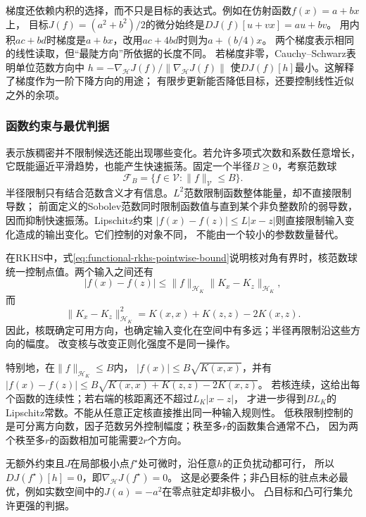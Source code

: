 梯度还依赖内积的选择，而不只是目标的表达式。例如在仿射函数$f(x)=a+bx$上，
目标$J(f)=(a^2+b^2)/2$的微分始终是$DJ(f)[u+vx]=au+bv$。
用内积$ac+bd$时梯度是$a+bx$，改用$ac+4bd$时则为$a+(b/4)x$。
两个梯度表示相同的线性读取，但“最陡方向”所依据的长度不同。
若梯度非零，Cauchy--Schwarz表明单位范数方向中
$h=-\nabla_{\mathcal H}J(f)/\lVert\nabla_{\mathcal H}J(f)\rVert$
使$DJ(f)[h]$最小。这解释了梯度作为一阶下降方向的用途；
有限步更新能否降低目标，还要控制线性近似之外的余项。

\subsubsection{函数约束与最优判据}

表示族稠密并不限制候选还能出现哪些变化。若允许多项式次数和系数任意增长，
它既能逼近平滑趋势，也能产生快速振荡。固定一个半径$B\geq0$，考察范数球
\[
  \mathcal{F}_B
  =
  \{f\in\mathcal{V}:\lVert f\rVert_{\mathcal{V}}\leq B\}.
\]
半径限制只有结合范数含义才有信息。$L^2$范数限制函数整体能量，却不直接限制导数；
前面定义的Sobolev范数同时限制函数值与直到某个非负整数阶的弱导数，
因而抑制快速振荡。Lipschitz约束
$|f(x)-f(z)|\leq L|x-z|$则直接限制输入变化造成的输出变化。它们控制的对象不同，
不能由一个较小的参数数量替代。

在RKHS中，式\eqref{eq:functional-rkhs-pointwise-bound}说明核对角有界时，核范数球
统一控制点值。两个输入之间还有
\begin{equation}
  |f(x)-f(z)|
  \leq
  \lVert f\rVert_{\mathcal{H}_K}
  \lVert K_x-K_z\rVert_{\mathcal{H}_K},
  \label{eq:functional-rkhs-modulus-bound}
\end{equation}
而
\[
  \lVert K_x-K_z\rVert_{\mathcal{H}_K}^2
  =
  K(x,x)+K(z,z)-2K(x,z).
\]
因此，核既确定可用方向，也确定输入变化在空间中有多远；半径再限制沿这些方向的幅度。
改变核与改变正则化强度不是同一操作。

特别地，在$\lVert f\rVert_{\mathcal H_K}\leq B$内，
$|f(x)|\leq B\sqrt{K(x,x)}$，并有
$|f(x)-f(z)|\leq B\sqrt{K(x,x)+K(z,z)-2K(x,z)}$。
若核连续，这给出每个函数的连续性；若右端的核距离还不超过$L_K|x-z|$，
才进一步得到$BL_K$的Lipschitz常数。不能从任意正定核直接推出同一种输入规则性。
低秩限制控制的是可分离方向数，因子范数另外控制幅度；秩至多$r$的函数集合通常不凸，
因为两个秩至多$r$的函数相加可能需要$2r$个方向。

无额外约束且$J$在局部极小点$f^\star$处可微时，沿任意$h$的正负扰动都可行，
所以$DJ(f^\star)[h]=0$，即$\nabla_{\mathcal H}J(f^\star)=0$。
这是必要条件；非凸目标的驻点未必最优，例如实数空间中的$J(a)=-a^2$在零点驻定却非极小。
凸目标和凸可行集允许更强的判据。

